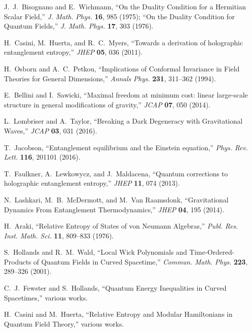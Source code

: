 \documentclass[aps,prd,onecolumn,superscriptaddress,nofootinbib]{revtex4-2}
\begin{document}

\begin{thebibliography}{99}

J.~J.~Bisognano and E.~Wichmann,
``On the Duality Condition for a Hermitian Scalar Field,'' \emph{J. Math. Phys.} \textbf{16}, 985 (1975);
``On the Duality Condition for Quantum Fields,'' \emph{J. Math. Phys.} \textbf{17}, 303 (1976).

H.~Casini, M.~Huerta, and R.~C.~Myers,
``Towards a derivation of holographic entanglement entropy,''
\emph{JHEP} \textbf{05}, 036 (2011).

H.~Osborn and A.~C.~Petkou,
``Implications of Conformal Invariance in Field Theories for General Dimensions,''
\emph{Annals Phys.} \textbf{231}, 311–362 (1994).

E.~Bellini and I.~Sawicki,
``Maximal freedom at minimum cost: linear large-scale structure in general modifications of gravity,''
\emph{JCAP} \textbf{07}, 050 (2014).

L.~Lombriser and A.~Taylor,
``Breaking a Dark Degeneracy with Gravitational Waves,''
\emph{JCAP} \textbf{03}, 031 (2016).

T.~Jacobson,
``Entanglement equilibrium and the Einstein equation,''
\emph{Phys. Rev. Lett.} \textbf{116}, 201101 (2016).

T.~Faulkner, A.~Lewkowycz, and J.~Maldacena,
``Quantum corrections to holographic entanglement entropy,''
\emph{JHEP} \textbf{11}, 074 (2013).

N.~Lashkari, M.~B.~McDermott, and M.~Van Raamsdonk,
``Gravitational Dynamics From Entanglement Thermodynamics,''
\emph{JHEP} \textbf{04}, 195 (2014).

H.~Araki, ``Relative Entropy of States of von Neumann Algebras,''
\emph{Publ. Res. Inst. Math. Sci.} \textbf{11}, 809–833 (1976).

S.~Hollands and R.~M.~Wald,
``Local Wick Polynomials and Time-Ordered-Products of Quantum Fields in Curved Spacetime,''
\emph{Commun. Math. Phys.} \textbf{223}, 289–326 (2001).

C.~J.~Fewster and S.~Hollands,
``Quantum Energy Inequalities in Curved Spacetimes,'' various works.

H.~Casini and M.~Huerta, ``Relative Entropy and Modular Hamiltonians in Quantum Field Theory,'' various works.


\end{thebibliography}
\end{document}
